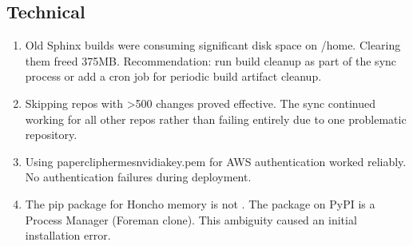 \documentclass[letterpaper,10pt,openany,oneside,english]{sphinxmanual}
\begin{document}
\subsection{Technical}
\label{\detokenize{lessons_learned:technical}}\begin{enumerate}
%
\item {} 
\sphinxAtStartPar
{} \textendash{} Old Sphinx builds were consuming significant
disk space on /home. Clearing them freed 375MB. Recommendation: run
build cleanup as part of the sync process or add a cron job for periodic
build artifact cleanup.

\item {} 
\sphinxAtStartPar
{} \textendash{} Skipping repos with \textgreater{}500 changes proved
effective. The sync continued working for all other repos rather than
failing entirely due to one problematic repository.

\item {} 
\sphinxAtStartPar
{} \textendash{} Using paperclip\sphinxhyphen{}hermes\sphinxhyphen{}nvidia\sphinxhyphen{}key.pem for AWS
authentication worked reliably. No authentication failures during
deployment.

\item {} 
\sphinxAtStartPar
{} \textendash{} The pip package for Honcho memory is 
not . The  package on PyPI is a Process Manager
(Foreman clone). This ambiguity caused an initial installation error.

\end{enumerate}
\end{document}
